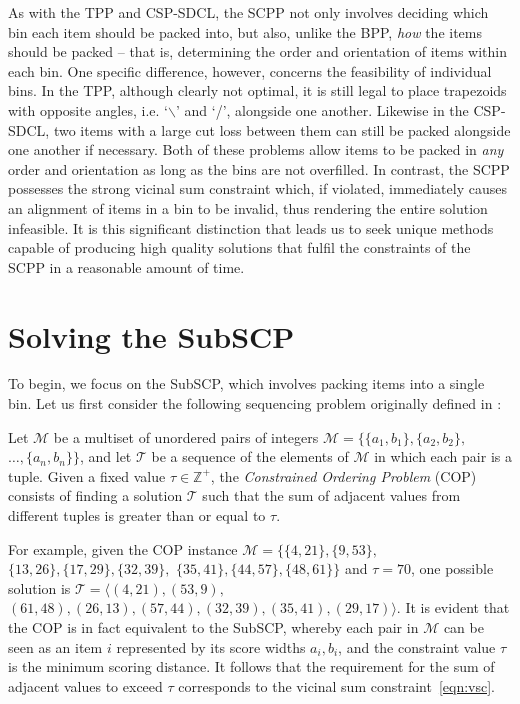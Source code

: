 \documentclass[a4paper,11pt,authoryear]{elsarticle}
\begin{document}
As with the TPP and CSP-SDCL, the SCPP not only involves deciding which bin each item should be packed into, but also, unlike the BPP, \emph{how} the items should be packed -- that is, determining the order and orientation of items within each bin. One specific difference, however, concerns the feasibility of individual bins. In the TPP, although clearly not optimal, it is still legal to place trapezoids with opposite angles, i.e. `$\backslash$' and `/', alongside one another. Likewise in the CSP-SDCL, two items with a large cut loss between them can still be packed alongside one another if necessary. Both of these problems allow items to be packed in \emph{any} order and orientation as long as the bins are not overfilled. In contrast, the SCPP possesses the strong vicinal sum constraint which, if violated, immediately causes an alignment of items in a bin to be invalid, thus rendering the entire solution infeasible. It is this significant distinction that leads us to seek unique methods capable of producing high quality solutions that fulfil the constraints of the SCPP in a reasonable amount of time.

\section{Solving the SubSCP}
\label{sec:ahc}
\noindent To begin, we focus on the SubSCP, which involves packing items into a single bin. Let us first consider the following sequencing problem originally defined in \cite{hawa2018}:

\begin{definition} %
	Let $\mathcal{M}$ be a multiset of unordered pairs of integers $\mathcal{M} = \{\{a_1, b_1\}, \{a_2, b_2\},$ $\dotsc,\{a_n, b_n\}\}$, and let $\mathcal{T}$ be a sequence of the elements of $\mathcal{M}$ in which each pair is a tuple. Given a fixed value $\tau \in \mathbb{Z}^+$, the \emph{Constrained Ordering Problem} (COP) consists of finding a solution $\mathcal{T}$ such that the sum of adjacent values from different tuples is greater than or equal to $\tau$.
	\label{defn:cop}
\end{definition}

\noindent For example, given the COP instance $\mathcal{M} = \{\{4,21\}, \{9,53\},$ $\{13,26\}, \{17,29\}, \{32,39\},$ $\{35,41\}, \{44,57\}, \{48,61\} \}$ and $\tau = 70$, one possible solution is $\mathcal{T} = \langle(4,21), (53,9),$ $(61,48), (26,13), (57,44), (32,39), (35,41), (29,17)\rangle$. It is evident that the COP is in fact equivalent to the SubSCP, whereby each pair in $\mathcal{M}$ can be seen as an item $i$ represented by its score widths $a_i, b_i$, and the constraint value $\tau$ is the minimum scoring distance. It follows that the requirement for the sum of adjacent values to exceed $\tau$ corresponds to the vicinal sum constraint~\eqref{eqn:vsc}.
\end{document}
